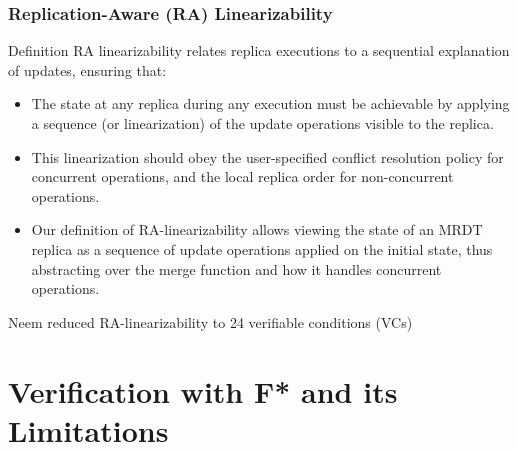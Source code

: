 \documentclass[usepdftitle=false]{beamer}
\begin{document}
\begin{frame}
  \frametitle{Replication-Aware (RA) Linearizability}
  
  \begin{block}{Definition}
    RA linearizability relates replica executions to a sequential explanation of updates, ensuring that:
    \begin{itemize}[<+->]
\item The state at any replica during any execution must be achievable by applying a sequence (or linearization) of the
update operations visible to the replica.
\item This linearization should obey the user-specified
conflict resolution policy for concurrent operations, and the local replica order for non-concurrent
operations.
\item Our definition of RA-linearizability allows viewing the state of an MRDT replica as a sequence
of update operations applied on the initial state, thus abstracting over the merge function and how
it handles concurrent operations. 
    \end{itemize}
  \end{block}
  
  \vspace{0.3cm}
  Neem reduced RA-linearizability to 24 verifiable conditions (VCs)
\end{frame}

\section{Verification with F* and its Limitations}
\end{document}
